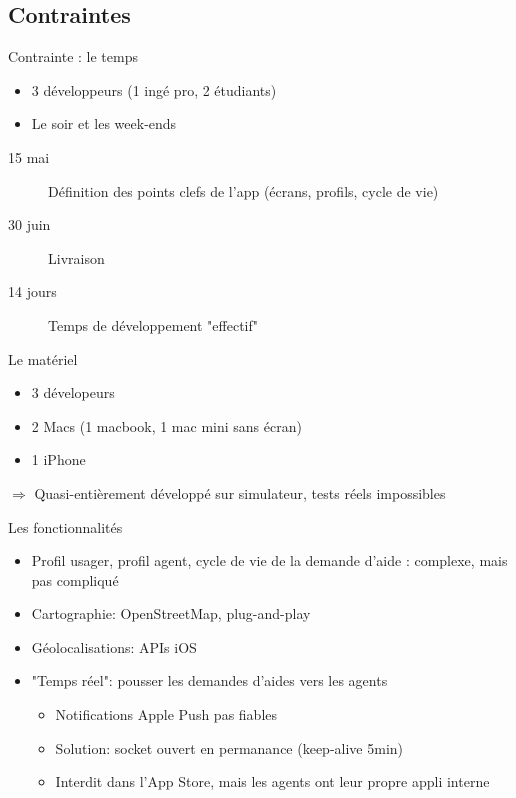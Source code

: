 \documentclass{beamer}
\begin{document}
\subsection{Contraintes}
\begin{frame}{Contrainte : le temps}
    \begin{itemize}
        \item 3 développeurs (1 ingé pro, 2 étudiants)
        \item Le soir et les week-ends
    \end{itemize}
    \begin{description}
        \item[15 mai] Définition des points clefs de l'app (écrans, profils, cycle de vie)
        \item[30 juin] Livraison
        \item[14 jours] Temps de développement "effectif"
    \end{description}
\end{frame}
\begin{frame}{Le matériel}
	\begin{itemize}
		\item 3 dévelopeurs
		\item 2 Macs (1 macbook, 1 mac mini sans écran)
		\item 1 iPhone
	\end{itemize}

	$\Rightarrow$ Quasi-entièrement développé sur simulateur, tests réels impossibles
\end{frame}
\begin{frame}{Les fonctionnalités}
    \begin{itemize}
        \item Profil usager, profil agent, cycle de vie de la demande d'aide : complexe, mais pas compliqué
        \item Cartographie: OpenStreetMap, plug-and-play
        \item Géolocalisations: APIs iOS
        \item "Temps réel": pousser les demandes d'aides vers les agents
            \begin{itemize}
                \item Notifications Apple Push pas fiables
                \item Solution: socket ouvert en permanance (keep-alive 5min)
                \item Interdit dans l'App Store, mais les agents ont leur propre appli interne
            \end{itemize}
    \end{itemize}
\end{frame}
\end{document}
